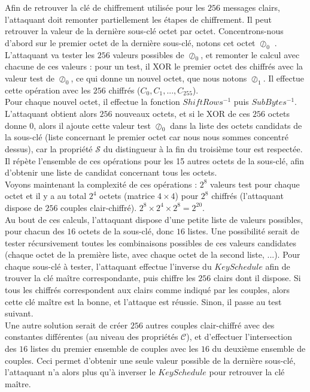 \indent Afin de retrouver la clé de chiffrement utilisée pour les $256$ messages clairs, l'attaquant doit remonter partiellement les étapes de chiffrement. Il peut retrouver la valeur de la dernière sous-clé octet par octet. Concentrons-nous d'abord sur le premier octet de la dernière sous-clé, notons cet octet $\oslash_0$ . L'attaquant va tester les $256$ valeurs possibles de $\oslash_0$, et remonter le calcul avec chacune de ces valeurs : pour un test, il XOR le premier octet des chiffrés avec la valeur test de $\oslash_0$, ce qui donne un nouvel octet, que nous notons $\oslash_1$. Il effectue cette opération avec les $256$ chiffrés ($C_0, C_1, ... , C_{255}$). \\
\indent Pour chaque nouvel octet, il effectue la fonction $ShiftRows^{-1}$ puis $SubBytes^{-1}$. L'attaquant obtient alors $256$ nouveaux octets, et si le XOR de ces $256$ octets donne $0$, alors il ajoute cette valeur test $\oslash_0$ dans la liste des octets candidats de la sous-clé (liste concernant le premier octet car nous nous sommes concentré dessus), car la propriété $\mathcal{S}$ du distingueur à la fin du troisième tour est respectée. Il répète l'ensemble de ces opérations pour les 15 autres octets de la sous-clé, afin d'obtenir une liste de candidat concernant tous les octets. \\
\indent Voyons maintenant la complexité de ces opérations : $2^8$ valeurs test pour chaque octet et il y a au total $2^4$ octets (matrice $4 \times 4$) pour $2^8$ chiffrés (l'attaquant dispose de $256$ couples clair-chiffré). $2^8 \times 2^4 \times 2^8 = 2^{20}$. \\
\indent Au bout de ces calculs, l'attaquant dispose d'une petite liste de valeurs possibles, pour chacun des $16$ octets de la sous-clé, donc $16$ listes. Une possibilité serait de tester récursivement toutes les combinaisons possibles de ces valeurs candidates (chaque octet de la première liste, avec chaque octet de la second liste, ...). Pour chaque sous-clé à tester, l'attaquant effectue l'inverse du $KeySchedule$ afin de trouver la clé maître correspondante, puis chiffre les $256$ clairs dont il dispose. Si tous les chiffrés correspondent aux clairs comme indiqué par les couples, alors cette clé maître est la bonne, et l'attaque est réussie. Sinon, il passe au test suivant. \\
\indent Une autre solution serait de créer $256$ autres couples clair-chiffré avec des constantes différentes (au niveau des propriétés $\mathcal{C}$), et d'effectuer l'intersection des $16$ listes du premier ensemble de couples avec les $16$ du deuxième ensemble de couples. Ceci permet d'obtenir une seule valeur possible de la dernière sous-clé, l'attaquant n'a alors plus qu'à inverser le $KeySchedule$ pour retrouver la clé maître. \\
